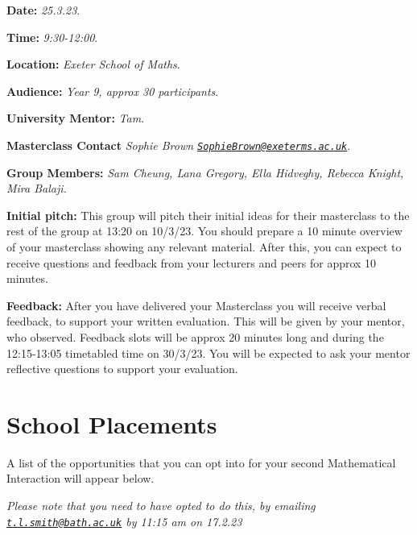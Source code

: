 \documentclass[
]{book}
\newenvironment{information}{
  \definecolor{shadecolor}{rgb}{0.8, 0.9,1.0}
  \definecolor{text-colour}{rgb}{0, 0.25, 0.52}
  \color{text-colour}
  \begin{shaded}}
 {\end{shaded}}
\begin{document}
\begin{information}
\textbf{Date:} \emph{25.3.23}.

\textbf{Time:} \emph{9:30-12:00}.

\textbf{Location:} \emph{Exeter School of Maths}.

\textbf{Audience:} \emph{Year 9, approx 30 participants}.

\textbf{University Mentor:} \emph{Tam}.

\textbf{Masterclass Contact} \emph{Sophie Brown \href{mailto:SophieBrown@exeterms.ac.uk}{\nolinkurl{SophieBrown@exeterms.ac.uk}}}.

\textbf{Group Members:} \emph{Sam Cheung, Lana Gregory, Ella Hidveghy, Rebecca Knight, Mira Balaji.}

\textbf{Initial pitch:} This group will pitch their initial ideas for their masterclass to the rest of the group at 13:20 on 10/3/23. You should prepare a 10 minute overview of your masterclass showing any relevant material. After this, you can expect to receive questions and feedback from your lecturers and peers for approx 10 minutes.

\textbf{Feedback:} After you have delivered your Masterclass you will receive verbal feedback, to support your written evaluation. This will be given by your mentor, who observed. Feedback slots will be approx 20 minutes long and during the 12:15-13:05 timetabled time on 30/3/23. You will be expected to ask your mentor reflective questions to support your evaluation.

\end{information}

\hypertarget{school-placements}{%
\chapter*{School Placements}\label{school-placements}}

A list of the opportunities that you can opt into for your second Mathematical Interaction will appear below.

\emph{Please note that you need to have opted to do this, by emailing \href{mailto:t.l.smith@bath.ac.uk}{\nolinkurl{t.l.smith@bath.ac.uk}} by 11:15 am on 17.2.23}
\end{document}
